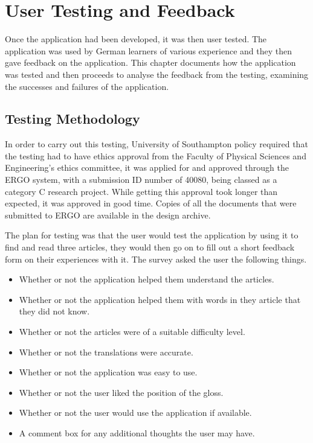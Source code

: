\chapter{User Testing and Feedback}

Once the application had been developed, it was then user tested. The application was used by German learners of various experience and they then gave feedback on the application. This chapter documents how the application was tested and then proceeds to analyse the feedback from the testing, examining the successes and failures of the application.

\section{Testing Methodology}

In order to carry out this testing, University of Southampton policy required that the testing had to have ethics approval from the Faculty of Physical Sciences and Engineering's ethics committee, it was applied for and approved through the ERGO system, with a submission ID number of 40080, being classed as a category C research project. While getting this approval took longer than expected, it was approved in good time. Copies of all the documents that were submitted to ERGO are available in the design archive. 

The plan for testing was that the user would test the application by using it to find and read three articles, they would then go on to fill out a short feedback form on their experiences with it. The survey asked the user the following things. 
\begin{itemize}
	\item Whether or not the application helped them understand the articles.
	
	\item Whether or not the application helped them with words in they article that they did not know.
	
	\item Whether or not the articles were of a suitable difficulty level.
	
	\item Whether or not the translations were accurate.
	
	\item Whether or not the application was easy to use.
	
	\item Whether or not the user liked the position of the gloss.
	
	\item Whether or not the user would use the application if available. 
	
	\item A comment box for any additional thoughts the user may have. 
\end{itemize}


